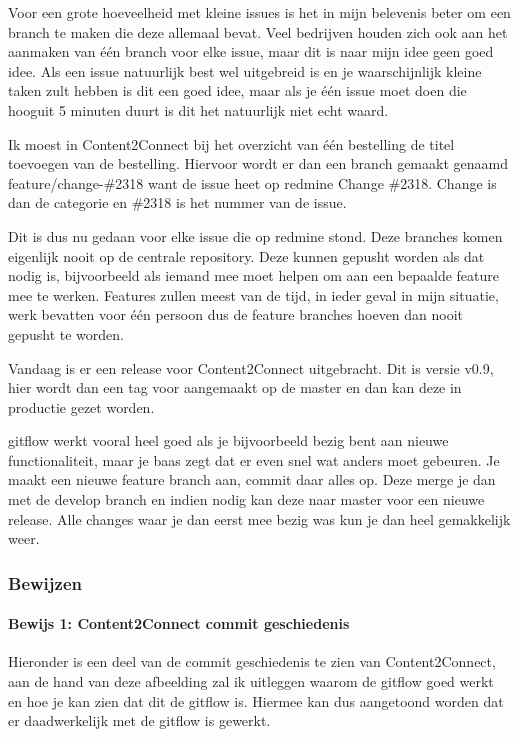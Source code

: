 Voor een grote hoeveelheid met kleine issues is het in mijn belevenis beter om een branch te maken die deze allemaal bevat. Veel bedrijven houden zich ook aan het aanmaken van één branch voor elke issue, maar dit is naar mijn idee geen goed idee. Als een issue natuurlijk best wel uitgebreid is en je waarschijnlijk kleine taken zult hebben is dit een goed idee, maar als je één issue moet doen die hooguit 5 minuten duurt is dit het natuurlijk niet echt waard.

Ik moest in Content2Connect bij het overzicht van één bestelling de titel toevoegen van de bestelling. Hiervoor wordt er dan een branch gemaakt genaamd feature/change-\#2318 want de issue heet op \gls{redmine} Change \#2318. Change is dan de categorie en \#2318 is het nummer van de issue.

Dit is dus nu gedaan voor elke issue die op \gls{redmine} stond. Deze branches komen eigenlijk nooit op de centrale repository. Deze kunnen gepusht worden als dat nodig is, bijvoorbeeld als iemand mee moet helpen om aan een bepaalde feature mee te werken. Features zullen meest van de tijd, in ieder geval in mijn situatie, werk bevatten voor één persoon dus de feature branches hoeven dan nooit gepusht te worden.

Vandaag is er een release voor Content2Connect uitgebracht. Dit is versie v0.9, hier wordt dan een tag voor aangemaakt op de master en dan kan deze in productie gezet worden.

\gls{gitflow} werkt vooral heel goed als je bijvoorbeeld bezig bent aan nieuwe functionaliteit, maar je baas zegt dat er even snel wat anders moet gebeuren. Je maakt een nieuwe feature branch aan, commit daar alles op. Deze merge je dan met de develop branch en indien nodig kan deze naar master voor een nieuwe release. Alle changes waar je dan eerst mee bezig was kun je dan heel gemakkelijk weer.

\subsubsection{Bewijzen}
\paragraph{Bewijs 1: Content2Connect commit geschiedenis}
Hieronder is een deel van de commit geschiedenis te zien van Content2Connect, aan de hand van deze afbeelding zal ik uitleggen waarom de \gls{gitflow} goed werkt en hoe je kan zien dat dit de \gls{gitflow} is. Hiermee kan dus aangetoond worden dat er daadwerkelijk met de \gls{gitflow} is gewerkt.

